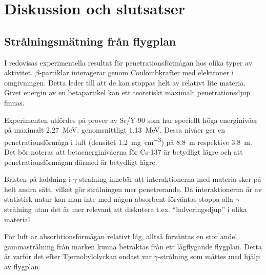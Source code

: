 \section{Diskussion och slutsatser}

\subsection{Strålningsmätning från flygplan}

I \cite{penetration} redovisas experimentella resultat för penetrationsförmågan
hos olika typer av aktivitet. $\beta$-partiklar interagerar genom
Coulombkrafter med elektroner i omgivningen. Detta leder till att de kan
stoppas helt av relativt lite materia. Givet energin av en betapartikel kan
ett teoretiskt maximalt penetrationsdjup finnas.

Experimenten utfördes på prover av Sr/Y-90 som har speciellt höga energinivåer
på maximalt \qty{2.27}{\MeV}, genomsnittligt \qty{1.13}{\MeV}. Dessa nivåer ger
en penetrationsförmåga i luft (densitet \qty{1.2}{\mg\per\cm\cubed}) på
\qty{8.8}{\m} respektive \qty{3.8}{\m}. Det bör noteras att betaenerginivåerna
för Cs-137 är betydligt lägre \parencite{fysika} och att penetrationsförmågan
därmed är betydligt lägre.

Bristen på laddning i $\gamma$-strålning innebär att interaktionerna med
materia sker på helt andra sätt, vilket gör strålningen mer penetrerande. Då
interaktionerna är av statistisk natur kan man inte med någon absorbent
förväntas stoppa alla $\gamma$-strålning utan det är mer relevant att diskutera
t.ex. ``halveringsdjup'' i olika material.

För luft är absorbtionsförmågan relativt låg, alltså förväntas en stor andel
gammastrålning från marken kunna betraktas från ett lågflygande flygplan. Detta
är varför det efter Tjernobylolyckan endast var $\gamma$-strålning som mättes
med hjälp av flygplan.
